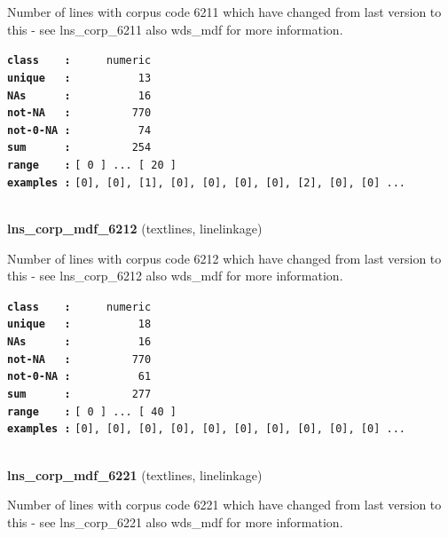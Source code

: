 \documentclass[]{article}
\begin{document}
Number of lines with corpus code 6211 which have changed from last
version to this - see lns\_corp\_6211 also wds\_mdf for more
information.

\textbf{\texttt{class\ \ \ \ :}} \texttt{~~~~~numeric}\\
\textbf{\texttt{unique\ \ \ :}} \texttt{~~~~~~~~~~13}\\
\textbf{\texttt{NAs\ \ \ \ \ \ :}} \texttt{~~~~~~~~~~16}\\
\textbf{\texttt{not-NA\ \ \ :}} \texttt{~~~~~~~~~770}\\
\textbf{\texttt{not-0-NA\ :}} \texttt{~~~~~~~~~~74}\\
\textbf{\texttt{sum\ \ \ \ \ \ :}} \texttt{~~~~~~~~~254}\\
\textbf{\texttt{range\ \ \ \ :}}
\texttt{{[}\ 0\ {]}\ ...\ {[}\ 20\ {]}}\\
\textbf{\texttt{examples\ :}}
\texttt{{[}0{]},\ {[}0{]},\ {[}1{]},\ {[}0{]},\ {[}0{]},\ {[}0{]},\ {[}0{]},\ {[}2{]},\ {[}0{]},\ {[}0{]}\ ...}\\

~

\textbf{lns\_corp\_mdf\_6212} (textlines, linelinkage)

Number of lines with corpus code 6212 which have changed from last
version to this - see lns\_corp\_6212 also wds\_mdf for more
information.

\textbf{\texttt{class\ \ \ \ :}} \texttt{~~~~~numeric}\\
\textbf{\texttt{unique\ \ \ :}} \texttt{~~~~~~~~~~18}\\
\textbf{\texttt{NAs\ \ \ \ \ \ :}} \texttt{~~~~~~~~~~16}\\
\textbf{\texttt{not-NA\ \ \ :}} \texttt{~~~~~~~~~770}\\
\textbf{\texttt{not-0-NA\ :}} \texttt{~~~~~~~~~~61}\\
\textbf{\texttt{sum\ \ \ \ \ \ :}} \texttt{~~~~~~~~~277}\\
\textbf{\texttt{range\ \ \ \ :}}
\texttt{{[}\ 0\ {]}\ ...\ {[}\ 40\ {]}}\\
\textbf{\texttt{examples\ :}}
\texttt{{[}0{]},\ {[}0{]},\ {[}0{]},\ {[}0{]},\ {[}0{]},\ {[}0{]},\ {[}0{]},\ {[}0{]},\ {[}0{]},\ {[}0{]}\ ...}\\

~

\textbf{lns\_corp\_mdf\_6221} (textlines, linelinkage)

Number of lines with corpus code 6221 which have changed from last
version to this - see lns\_corp\_6221 also wds\_mdf for more
information.
\end{document}
